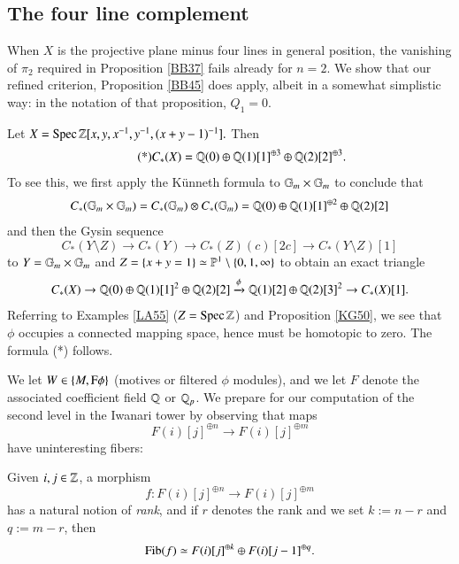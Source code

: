 \subsection{The four line complement}
\label{sSec:4L}

When $X$ is the projective plane minus four lines in general position, the vanishing of $\pi_2$ required in Proposition \ref{BB37} fails already for $n = 2$. We show that our refined criterion, Proposition \ref{BB45} does apply, albeit in a somewhat simplistic way: in the notation of that proposition, $Q_1 = 0$. 

\sspar{}
\label{FA11}
Let 
$
X = \operatorname{Spec} \mathbb{Z}[x,y,x^{-1}, y^{-1}, (x+y-1)^{-1}].
$
Then
\[
\tag{*}
C_*(X) = \mathbb{Q}(0) \oplus \mathbb{Q}(1)[1]^{\oplus 3} \oplus \mathbb{Q}(2)[2]^{\oplus 3}.
\]
To see this, we first apply the K\"unneth formula to ${\mathbb{G}_m} \times {\mathbb{G}_m}$ to conclude that 
\[
C_*({\mathbb{G}_m} \times {\mathbb{G}_m}) = C_*({\mathbb{G}_m}) \otimes C_*({\mathbb{G}_m}) = 
\mathbb{Q}(0) \oplus \mathbb{Q}(1)[1]^{\oplus 2} \oplus \mathbb{Q}(2)[2]
\]
and then the Gysin sequence \cite[15.5.4]{Mazza}
\[
C_*(Y \setminus Z) \to C_*(Y) \to C_*(Z)(c)[2c] \to C_*(Y \setminus Z)[1]
\]
to $Y = {\mathbb{G}_m} \times {\mathbb{G}_m}$ and $Z = \{x+y = 1\} \simeq \mathbb{P}^1 \setminus \{0,1,\infty\}$
to obtain an exact triangle
\[
C_*(X) \to \mathbb{Q}(0) \oplus \mathbb{Q}(1)[1]^2 \oplus \mathbb{Q}(2)[2] 
\xrightarrow{\phi}
\mathbb{Q}(1)[2] \oplus \mathbb{Q}(2)[3]^2 \to C_*(X)[1].
\]
Referring to Examples \ref{LA55} ($Z = \operatorname{Spec} \mathbb{Z}$) and Proposition \ref{KG50}, we see that $\phi$ occupies a connected mapping space, hence must be homotopic to zero. The formula (*) follows. 

\sspar{}
\label{FA12}
We let $W \in \{M, {\mathrm{F}\phi}\}$ (motives or filtered $\phi$ modules), and we let $F$ denote the associated coefficient field $\mathbb{Q}$ or ${\mathbb{Q}_p}$. We prepare for our computation of the second level in the Iwanari tower by observing that maps 
\[
F(i)[j]^{\oplus n} \to F(i)[j]^{\oplus m}
\]
have uninteresting fibers:

\begin{ssProposition}
\label{15j1}
Given $i, j \in \mathbb{Z}$, a morphism
\[
f: F(i)[j]^{\oplus n} \to F(i)[j]^{\oplus m}
\]
has a natural notion of \emph{rank}, and if $r$ denotes the rank and we set $k := n - r$ and $q := m-r$, then 
\[
\operatorname{Fib}(f) \simeq F(i)[j]^{\oplus k} \oplus F(i)[j-1]^{\oplus q}.
\]
\end{ssProposition}

